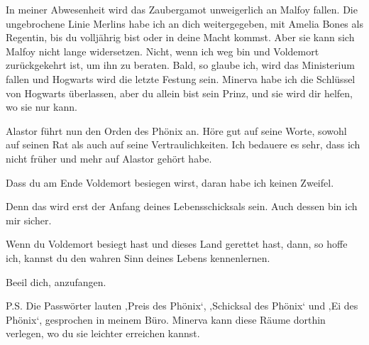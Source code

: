 \begin{writtenNote}
In meiner Abwesenheit wird das Zaubergamot unweigerlich an Malfoy fallen. Die ungebrochene Linie Merlins habe ich an dich weitergegeben, mit Amelia Bones als Regentin, bis du volljährig bist oder in deine Macht kommst. Aber sie kann sich Malfoy nicht lange widersetzen. Nicht, wenn ich weg bin und Voldemort zurückgekehrt ist, um ihn zu beraten. Bald, so glaube ich, wird das Ministerium fallen und Hogwarts wird die letzte Festung sein. Minerva habe ich die Schlüssel von Hogwarts überlassen, aber du allein bist sein Prinz, und sie wird dir helfen, wo sie nur kann.

Alastor führt nun den Orden des Phönix an. Höre gut auf seine Worte, sowohl auf seinen Rat als auch auf seine Vertraulichkeiten. Ich bedauere es sehr, dass ich nicht früher und mehr auf Alastor gehört habe.

Dass du am Ende Voldemort besiegen wirst, daran habe ich keinen Zweifel.

Denn das wird erst der Anfang deines Lebensschicksals sein. Auch dessen bin ich mir sicher.

Wenn du Voldemort besiegt hast und dieses Land gerettet hast, dann, so hoffe ich, kannst du den wahren Sinn deines Lebens kennenlernen.

Beeil dich, anzufangen.


P.S. Die Passwörter lauten ‚Preis des Phönix‘, ‚Schicksal des Phönix‘ und ‚Ei des Phönix‘, gesprochen in meinem Büro. Minerva kann diese Räume dorthin verlegen, wo du sie leichter erreichen kannst.
\end{writtenNote}

